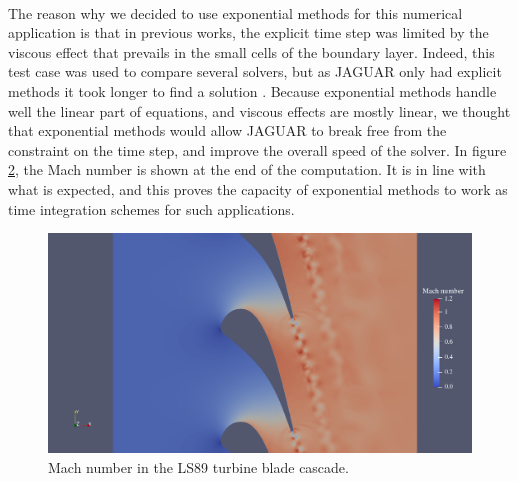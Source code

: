       \begin{figure}
        \centering
        \caption{}
        \label{fig:ls89_mesh}
      \end{figure}

      \paragraph{}
      The reason why we decided to use exponential methods for this numerical application is that in previous works, the explicit time step was limited by the viscous effect that prevails in the small cells of the boundary layer.
      Indeed, this test case was used to compare several solvers, but as JAGUAR only had explicit methods it took longer to find a solution \cite{BrunetCronerMinotEtAl2018}.
      Because exponential methods handle well the linear part of equations, and viscous effects are mostly linear, we thought that exponential methods would allow JAGUAR to break free from the constraint on the time step, and improve the overall speed of the solver.
      In figure \ref{fig:ls89_field}, the Mach number is shown at the end of the computation.
      It is in line with what is expected, and this proves the capacity of exponential methods to work as time integration schemes for such applications.

      \begin{figure}
        \centering
        \includegraphics[width=\textwidth]{figures/ls89_field.png}
        \caption{Mach number in the LS89 turbine blade cascade.}
        \label{fig:ls89_field}
      \end{figure}
